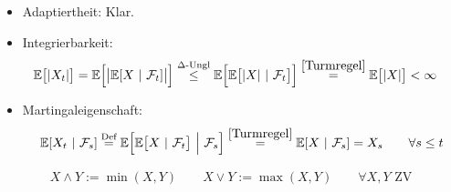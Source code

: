 \begin{beisp}
\begin{enumerate}[label=(\alph*)]
\begin{itemize}
			\item Adaptiertheit: Klar.
			\item Integrierbarkeit:
			\begin{align*}
				\mathbb{E}\big[|X_t|\big]
				=\mathbb{E}\Big[\big|\mathbb{E}[X~|~\mathcal{F}_t]\big|\Big]
				&\stackrel{\Delta\text{-Ungl}}{\leq}
				\mathbb{E}\Big[\mathbb{E}\big[|X|~|~\mathcal{F}_t \big]\Big]
				\stackrel{\eqref{Turmregel}}{=}
				\mathbb{E}\big[|X|\big]
				<\infty
			\end{align*}
			\item Martingaleigenschaft:
			\begin{align*}
				\mathbb{E}[X_t~|~\mathcal{F}_s]
				\stackrel{\text{Def}}{=}\mathbb{E}\Big[\mathbb{E}\big[X~|~\mathcal{F}_t\big]~\Big|~ \mathcal{F}_s\Big]
				\stackrel{\eqref{Turmregel}}{=}
				\mathbb{E}[X~|~\mathcal{F}_s]
				=X_s
				\qquad\forall s\leq t
			\end{align*}
		\end{itemize}
	\end{enumerate}
\end{beisp}

\begin{notation}
	\begin{align*}
		X\wedge Y:=\min(X,Y)\qquad X\vee Y:=\max(X,Y)\qquad\forall X,Y\text{ ZV}
	\end{align*}
\end{notation}

